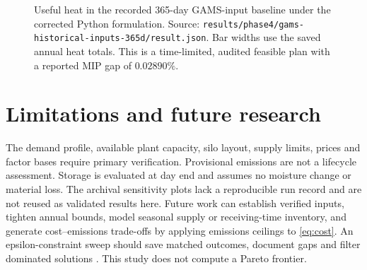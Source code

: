 \documentclass[11pt,a4paper]{article}
\begin{document}
\begin{figure}[!htbp]
\centering
{}
\caption{Useful heat in the recorded 365-day GAMS-input baseline under the
corrected Python formulation. Source: \nolinkurl{results/phase4/gams-historical-inputs-365d/result.json}.
Bar widths use the saved annual heat totals. This is a time-limited,
audited feasible plan with a reported MIP gap of \(0.02890\%\).}
\label{fig:annual-heat}
\end{figure}

\section{Limitations and future research}
The demand profile, available plant capacity, silo layout, supply limits,
prices and factor bases require primary verification. Provisional emissions
are not a lifecycle assessment. Storage is evaluated at day end and assumes
no moisture change or material loss. The archival sensitivity plots lack
a reproducible run record and are not reused as validated results here.
Future work can establish verified inputs, tighten annual bounds, model
seasonal supply or receiving-time inventory, and generate cost--emissions
trade-offs by applying emissions ceilings to \eqref{eq:cost}. An
epsilon-constraint sweep should save matched outcomes, document gaps and
filter dominated solutions \cite{mavrotas2009}. This study does not
compute a Pareto frontier.
\end{document}
